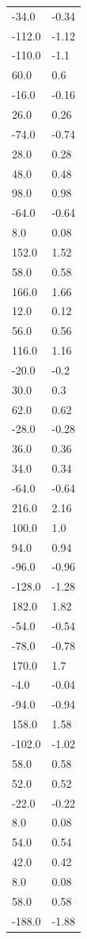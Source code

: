 \begin{longtable}{ll}
-34.0 & -0.34 \\
-112.0 & -1.12 \\
-110.0 & -1.1 \\
60.0 & 0.6 \\
-16.0 & -0.16 \\
26.0 & 0.26 \\
-74.0 & -0.74 \\
28.0 & 0.28 \\
48.0 & 0.48 \\
98.0 & 0.98 \\
-64.0 & -0.64 \\
8.0 & 0.08 \\
152.0 & 1.52 \\
58.0 & 0.58 \\
166.0 & 1.66 \\
12.0 & 0.12 \\
56.0 & 0.56 \\
116.0 & 1.16 \\
-20.0 & -0.2 \\
30.0 & 0.3 \\
62.0 & 0.62 \\
-28.0 & -0.28 \\
36.0 & 0.36 \\
34.0 & 0.34 \\
-64.0 & -0.64 \\
216.0 & 2.16 \\
100.0 & 1.0 \\
94.0 & 0.94 \\
-96.0 & -0.96 \\
-128.0 & -1.28 \\
182.0 & 1.82 \\
-54.0 & -0.54 \\
-78.0 & -0.78 \\
170.0 & 1.7 \\
-4.0 & -0.04 \\
-94.0 & -0.94 \\
158.0 & 1.58 \\
-102.0 & -1.02 \\
58.0 & 0.58 \\
52.0 & 0.52 \\
-22.0 & -0.22 \\
8.0 & 0.08 \\
54.0 & 0.54 \\
42.0 & 0.42 \\
8.0 & 0.08 \\
58.0 & 0.58 \\
-188.0 & -1.88 \\

\end{longtable}
